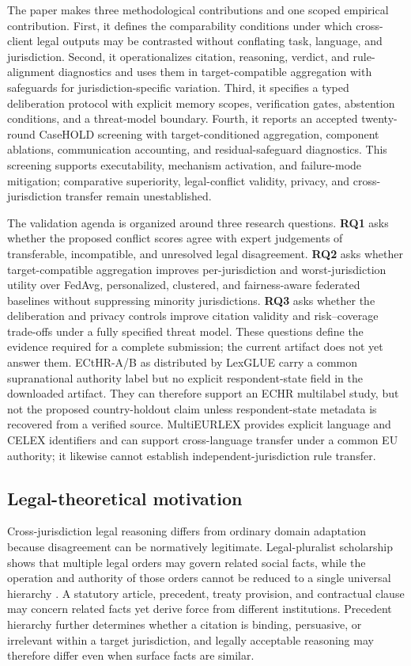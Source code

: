 \documentclass[preprint,12pt,authoryear]{elsarticle}
\begin{document}
The paper makes three methodological contributions and one scoped empirical contribution. First, it defines the comparability conditions under which cross-client legal outputs may be contrasted without conflating task, language, and jurisdiction. Second, it operationalizes citation, reasoning, verdict, and rule-alignment diagnostics and uses them in target-compatible aggregation with safeguards for jurisdiction-specific variation. Third, it specifies a typed deliberation protocol with explicit memory scopes, verification gates, abstention conditions, and a threat-model boundary. Fourth, it reports an accepted twenty-round CaseHOLD screening with target-conditioned aggregation, component ablations, communication accounting, and residual-safeguard diagnostics. This screening supports executability, mechanism activation, and failure-mode mitigation; comparative superiority, legal-conflict validity, privacy, and cross-jurisdiction transfer remain unestablished.

The validation agenda is organized around three research questions. \textbf{RQ1} asks whether the proposed conflict scores agree with expert judgements of transferable, incompatible, and unresolved legal disagreement. \textbf{RQ2} asks whether target-compatible aggregation improves per-jurisdiction and worst-jurisdiction utility over FedAvg, personalized, clustered, and fairness-aware federated baselines without suppressing minority jurisdictions. \textbf{RQ3} asks whether the deliberation and privacy controls improve citation validity and risk--coverage trade-offs under a fully specified threat model. These questions define the evidence required for a complete submission; the current artifact does not yet answer them. ECtHR-A/B as distributed by LexGLUE carry a common supranational authority label but no explicit respondent-state field in the downloaded artifact. They can therefore support an ECHR multilabel study, but not the proposed country-holdout claim unless respondent-state metadata is recovered from a verified source. MultiEURLEX provides explicit language and CELEX identifiers and can support cross-language transfer under a common EU authority; it likewise cannot establish independent-jurisdiction rule transfer.

\subsection{Legal-theoretical motivation}

Cross-jurisdiction legal reasoning differs from ordinary domain adaptation because disagreement can be normatively legitimate. Legal-pluralist scholarship shows that multiple legal orders may govern related social facts, while the operation and authority of those orders cannot be reduced to a single universal hierarchy \citep{griffiths1986legal,merry1988legal}. A statutory article, precedent, treaty provision, and contractual clause may concern related facts yet derive force from different institutions. Precedent hierarchy further determines whether a citation is binding, persuasive, or irrelevant within a target jurisdiction, and legally acceptable reasoning may therefore differ even when surface facts are similar.
\end{document}

